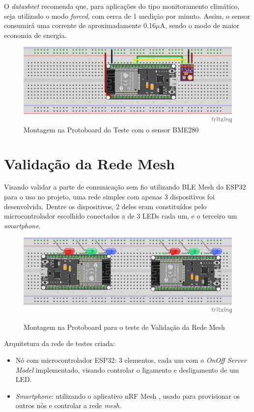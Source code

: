 \documentclass[../monografia.tex]{subfiles}
\begin{document}
O \textit{datasheet} recomenda que, para aplicações do tipo monitoramento climático, seja utilizado o modo \textit{forced}, com cerca de 1 medição por minuto. Assim, o sensor consumirá uma corrente de aproximadamente 0.16$\mu$A, sendo o modo de maior economia de energia. 

\begin{figure}[h]
	\centering
	\includegraphics[width=12cm]{teste_bme280}
	\caption{Montagem na Protoboard do Teste com o sensor BME280}
	\label{fig:time_bme280}
\end{figure}

\section{Validação da Rede Mesh}

Visando validar a parte de comunicação sem fio utilizando BLE Mesh do ESP32 para o uso no projeto, uma rede simples com apenas 3 dispositivos foi desenvolvida. Dentre os dispositivos, 2 deles eram constituídos pelo microcontrolador escolhido conectados a de 3 LEDs cada um, e o terceiro um \textit{smartphone}. 

\begin{figure}[h]
	\centering
		\includegraphics[width=.8\textwidth]{mesh_test}
		\label{fig:test}
		\caption{Montagem na Protoboard para o teste de Validação da Rede Mesh}
\end{figure}

Arquitetura da rede de testes criada:

\begin{itemize}
	\item Nó com microcontrolador ESP32: 3 elementos, cada um com o \textit{OnOff Server Model} \cite{ble-mesh-models} implementado, visando controlar o ligamento e desligamento de um LED.
	\item \textit{Smartphone}: utilizando o aplicativo nRF Mesh \cite{nrf-app}, usado para provisionar os outros nós e controlar a rede \textit{mesh}.
\end{itemize}
\end{document}
